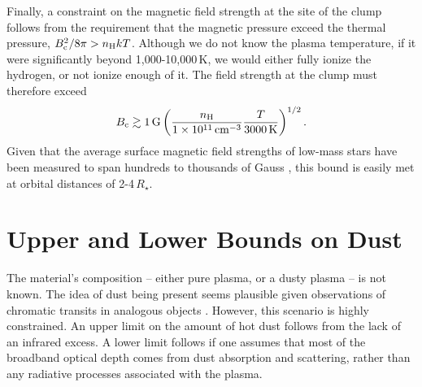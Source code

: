 \documentclass[11pt,twocolumn,tighten,linenumbers]{aastex7}
\begin{document}
Finally, a constraint on the magnetic field strength at the site of
the clump follows from the requirement that the magnetic pressure
exceed the thermal pressure, $B_{\rm c}^2 / 8\pi > n_{\rm H} k T$.
Although we do not know the plasma temperature, if it were
significantly beyond 1,000-10,000\,K, we would either fully ionize the
hydrogen, or not ionize enough of it.  The field strength at the clump
must therefore exceed
\begin{equation}
  B_{\rm c} \gtrsim 1\,{\rm G}
  \left(
  \frac{n_{\rm H}}{1\times10^{11}\,{\rm cm}^{-3}}
  \frac{T}{3000\,{\rm K}}
  \right)^{1/2}.
\end{equation}
Given that the average surface magnetic field strengths of low-mass
stars have been measured to span hundreds to thousands of Gauss
\citep{Donati2009,Kochukhov2021,Reiners2022}, this bound is easily met
at orbital distances of 2-4\,$R_\star$.

\section{Upper and Lower Bounds on Dust}
\label{subsec:dust}

The material's composition -- either pure plasma, or a dusty plasma --
is not known.  The idea of dust being present seems plausible given
observations of chromatic transits in analogous objects
\citep{Tanimoto2020,Gunther2022,Koen2023}.  However, this scenario is
highly constrained.  An upper limit on the amount of hot dust follows
from the lack of an infrared excess.  A lower limit follows if one
assumes that most of the broadband optical depth comes from dust
absorption and scattering, rather than any radiative processes
associated with the plasma.
\end{document}
